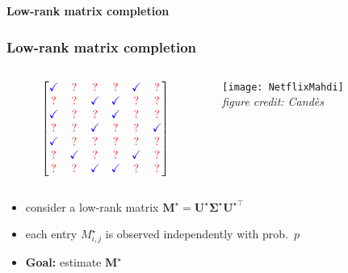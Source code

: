 \documentclass[compress,
mathserif,wide,%
]{beamer}
\begin{document}
\begin{frame}[plain]

\vfill
\begin{center}
  {\Large \bf Low-rank matrix completion}
\end{center}
\vfill

\end{frame}



\begin{frame}
\frametitle{Low-rank matrix completion}



\begin{columns}
\begin{column}{0.5\textwidth}
\[
 \begin{bmatrix}
   {\color{blue} \checkmark} & {\color{red} ?} &{\color{red} ?}  & {\color{red} ?} & {\color{blue} \checkmark} & {\color{red} ?} \\
   {\color{red} ?} & {\color{red} ?} & {\color{blue} \checkmark} & {\color{blue} \checkmark} & {\color{red} ?} & {\color{red} ?} \\
   {\color{blue} \checkmark} & {\color{red} ?} & {\color{red} ?} & {\color{blue} \checkmark} & {\color{red} ?} & {\color{red} ?} \\
   {\color{red} ?} & {\color{red} ?} & {\color{blue} \checkmark}  & {\color{red} ?} &{\color{red} ?}  & {\color{blue} \checkmark} \\
   {\color{blue} \checkmark}  &  {\color{red} ?} & {\color{red} ?} & {\color{red} ?}  & {\color{red} ?} & {\color{red} ?} \\
   {\color{red} ?} & {\color{blue} \checkmark} &{\color{red} ?}  & {\color{red} ?} & {\color{blue} \checkmark} & {\color{red} ?} \\
   {\color{red} ?}  &{\color{red} ?} & {\color{blue} \checkmark} &
   {\color{blue} \checkmark} & {\color{red} ?} & {\color{red} ?}
\end{bmatrix}
\]
\end{column}

\begin{column}{0.5\textwidth}  
\begin{center}
\texttt{[image: NetflixMahdi]} \\
\hfill {\footnotesize\em figure credit: Cand\`es ~~}
\end{center}
\end{column}

\end{columns}



\begin{itemize}
	\itemsep0.5em
	\item consider a low-rank matrix $\bm{M}^{\star} = \bm{U}^{\star} \bm{\Sigma}^{\star} \bm{U}^{\star\top}$
	\item each entry $M_{i,j}^{\star}$   is observed independently with prob.~$p$
	\item {\bf Goal:} estimate $\bm{M}^{\star}$
\end{itemize}

\end{frame}
\end{document}
